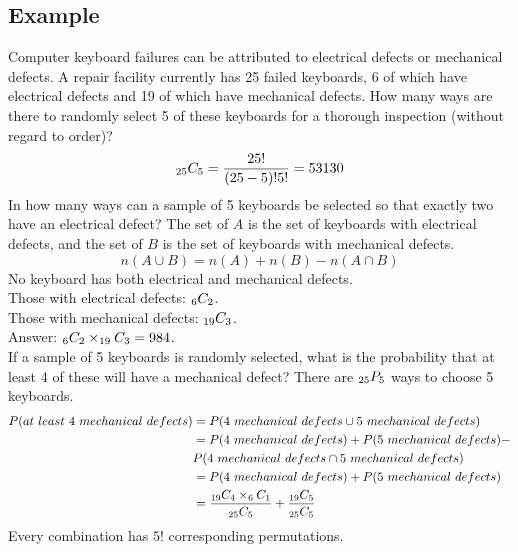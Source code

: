 \documentclass[letterpaper, 12pt]{math}
\begin{document}
\subsection*{Example}
Computer keyboard failures can be attributed to electrical defects or
mechanical defects. A repair facility currently has 25 failed keyboards, 6
of which have electrical defects and 19 of which have mechanical defects.
How many ways are there to randomly select 5 of these keyboards for a thorough
inspection (without regard to order)?
\[ _{25}C_{5} = \frac{25!}{(25-5)!5!} = 53130 \]
In how many ways can a sample of 5 keyboards be selected so that exactly two
have an electrical defect? The set of \( A \) is the set of keyboards with
electrical defects, and the set of \( B \) is the set of keyboards with
mechanical defects.
\[ n(A \cup B) = n(A) + n(B) - n(A \cap B) \]
No keyboard has both electrical and mechanical defects. \\
Those with electrical defects: \( _{6}C_{2} \). \\
Those with mechanical defects: \( _{19}C_{3} \). \\
Answer: \( _{6}C_{2} \times _{19}C_{3} = 984 \). \\
If a sample of 5 keyboards is randomly selected, what is the probability that
at least 4 of these will have a mechanical defect? There are \( _{25}P_{5} \)
ways to choose 5 keyboards. \\
\begin{align*}
  P(at\ least\ 4\ mechanical\ defects) &=
    P(4\ mechanical\ defects \cup 5\ mechanical\ defects) \\
  &= P(4\ mechanical\ defects)+P(5\ mechanical\ defects)- \\
  & P(4\ mechanical\ defects \cap 5\ mechanical\ defects) \\
  &= P(4\ mechanical\ defects)+P(5\ mechanical\ defects) \\
  &= \frac{_{19}C_{4}\times_{6}C_{1}}{_{25}C_{5}}+
    \frac{_{19}C_{5}}{_{25}C_{5}}
\end{align*}
Every combination has \( 5! \) corresponding permutations.
\end{document}
